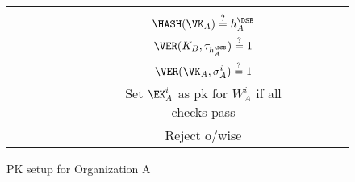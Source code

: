 \begin{sidewaysfigure}
\begin{table}[H]
\begin{adjustbox}{width=\textwidth}
\begin{tabular}{c c c c c c c c c c c c c}
& & \\

&&&&&&&& $\HASH(\VK_A) \stackrel{?}{=} h_A^\DSB$ \\
&&&&&&&& $\VER(K_B, \tau_{h_A^\DSB}) \stackrel{?}{=} 1$ \\
&&&&&&&& $\VER(\VK_A, \sigma^i_A) \stackrel{?}{=} 1$ \\
&&&&&&&& Set $\EK_A^i$ as pk for $W_A^i$ if all checks pass \\
&&&&&&&& Reject o/wise \\

\end{tabular}
\end{adjustbox}
\end{table}
\caption{PK setup for Organization A}
\end{sidewaysfigure}

